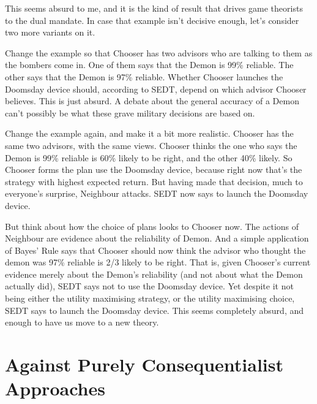 \documentclass[
  12pt,
  letterpaper,
  DIV=11,
  numbers=noendperiod]{scrreprt}
\begin{document}
This seems absurd to me, and it is the kind of result that drives game
theorists to the dual mandate. In case that example isn't decisive
enough, let's consider two more variants on it.

Change the example so that Chooser has two advisors who are talking to
them as the bombers come in. One of them says that the Demon is 99\%
reliable. The other says that the Demon is 97\% reliable. Whether
Chooser launches the Doomsday device should, according to SEDT, depend
on which advisor Chooser believes. This is just absurd. A debate about
the general accuracy of a Demon can't possibly be what these grave
military decisions are based on.

Change the example again, and make it a bit more realistic. Chooser has
the same two advisors, with the same views. Chooser thinks the one who
says the Demon is 99\% reliable is 60\% likely to be right, and the
other 40\% likely. So Chooser forms the plan use the Doomsday device,
because right now that's the strategy with highest expected return. But
having made that decision, much to everyone's surprise, Neighbour
attacks. SEDT now says to launch the Doomsday device.

But think about how the choice of plans looks to Chooser now. The
actions of Neighbour are evidence about the reliability of Demon. And a
simple application of Bayes' Rule says that Chooser should now think the
advisor who thought the demon was 97\% reliable is 2/3 likely to be
right. That is, given Chooser's current evidence merely about the
Demon's reliability (and not about what the Demon actually did), SEDT
says not to use the Doomsday device. Yet despite it not being either the
utility maximising strategy, or the utility maximising choice, SEDT says
to launch the Doomsday device. This seems completely absurd, and enough
to have us move to a new theory.

\hypertarget{sec-against-pure-consequence}{%
\section{Against Purely Consequentialist
Approaches}\label{sec-against-pure-consequence}}
\end{document}
